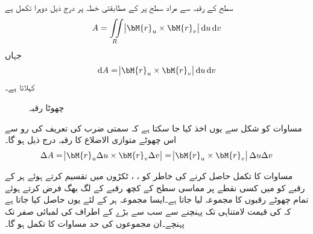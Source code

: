 سطح  کے رقبہ  سے مراد  سطح پر  کے مطابقتی خطہ  پر درج ذیل دوہرا تکمل ہے
\begin{align}\label{مساوات_خطی_تکمل_رقبہ_الف}
A=\iint\limits_R \abs{\bM{r}_u\times \bM{r}_v}\dif u\dif v
\end{align}  
جہاں
\begin{align}\label{مساوات_خطی_تکمل_رقبہ_ب}
\dif A=\abs{\bM{r}_u\times \bM{r}_v}\dif u\dif v
\end{align}
 کہلاتا ہے۔
\begin{figure}
\centering
{}
\caption{چھوٹا رقبہ}
\label{شکل_خطی_تکمل_چھوٹا_رقبہ}
\end{figure}

مساوات   کو شکل  سے یوں اخذ کیا جا سکتا ہے کہ سمتی ضرب کی تعریف کی رو سے اس چھوٹے متوازی الاضلاع کا رقبہ درج ذیل ہو گا۔
\begin{align*}
\Delta A=\abs{\bM{r}_u\Delta u\times \bM{r}_v\Delta v}=\abs{\bM{r}_u\times \bM{r}_v}\Delta u\Delta v
\end{align*}

مساوات    کا تکمل حاصل کرنے کی خاطر  کو ، ، ٹکڑوں میں تقسیم کرتے ہوئے  ہر  کے رقبے کو  میں کسی نقطے پر  مماسی سطح کے کچھ رقبے کے لگ بھگ فرض کرتے ہوئے تمام چھوٹے رقبوں کا مجموعہ لیا جاتا ہے۔ایسا مجموعہ ہر  کے لئے  یوں حاصل کیا جاتا ہے کہ   کی قیمت لامتناہی تک پہنچنے سے  سب سے بڑے  کے اطراف کی لمبائی صفر تک پہنچے۔ان مجموعوں کی حد مساوات    کا تکمل ہو گا۔

